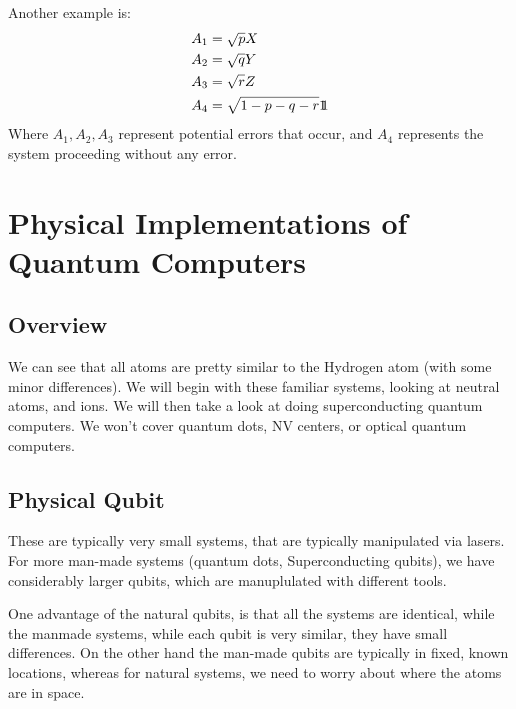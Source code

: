 Another example is:
\begin{align*}
	A_1 &= \sqrt{p} X \\
	A_2 &= \sqrt{q} Y \\
	A_3 &= \sqrt{r} Z \\
	A_4 &= \sqrt{1-p-q-r}1\!\!1
\end{align*}
Where $A_1,A_2,A_3$ represent potential errors that occur, and $A_4$ represents the system proceeding without any error.
\section{Physical Implementations of Quantum Computers}
\subsection{Overview}
We can see that all atoms are pretty similar to the Hydrogen atom (with some minor differences). We will begin with these familiar systems, looking at neutral atoms, and ions.
We will then take a look at doing superconducting quantum computers. We won't cover quantum dots, NV centers, or optical quantum computers.
\subsection{Physical Qubit}
These are typically very small systems, that are typically manipulated via lasers. For more man-made systems (quantum dots, Superconducting qubits), we have considerably larger qubits, which are manuplulated with different tools.

One advantage of the natural qubits, is that all the systems are identical, while the manmade systems, while each qubit is very similar, they have small differences.
On the other hand the man-made qubits are typically in fixed, known locations, whereas for natural systems, we need to worry about where the atoms are in space.
